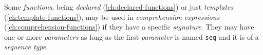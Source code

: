 Some \emph{functions},
being \emph{declared} (\ref{ch:declared-functions})
or just \emph{templates} (\ref{ch:template-functions}),
may be used in \emph{comprehension expressions} (\ref{ch:comprehension-functions})
if they have a specific \emph{signature}.
They may have one or more \emph{parameters}
as long as the first \emph{parameter} is named \verb|seq|
and it is of a \emph{sequence type}.

